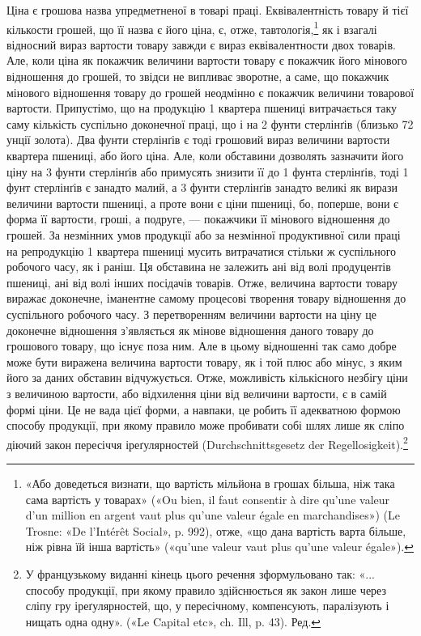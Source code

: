 Ціна є грошова назва упредметненої в товарі праці. Еквівалентність
товару й тієї кількости грошей, що її назва є його ціна, є,
отже, тавтологія,\footnote{
«Або доведеться визнати, що вартість мільйона в грошах більша,
ніж така сама вартість у товарах» («Ou bien, il faut consentir à dire qu’une
valeur d’un million en argent vaut plus qu’une valeur égale en marchandises»)
(Le Trosne: «De l’Intérêt Social», p. 992), отже, «що дана вартість варта
більше, ніж рівна їй інша вартість» («qu’une valeur vaut plus qu’une valeur
égale»).
} як і взагалі відносний вираз вартости товару
завжди є вираз еквівалентности двох товарів. Але, коли ціна
як покажчик величини вартости товару є покажчик його мінового
відношення до грошей, то звідси не випливає зворотне,
а саме, що покажчик мінового відношення товару до грошей
неодмінно є покажчик величини товарової вартости. Припустімо,
що на продукцію 1 квартера пшениці витрачається таку саму
кількість суспільно доконечної праці, що і на 2 фунти стерлінґів
(близько 72 унції золота). Два фунти стерлінґів є тоді грошовий
вираз величини вартости квартера пшениці, або його ціна.
Але, коли обставини дозволять зазначити його ціну на 3 фунти
стерлінґів або примусять знизити її до 1 фунта стерлінґів, тоді
1 фунт стерлінґів є занадто малий, а 3 фунти стерлінґів занадто
великі як вирази величини вартости пшениці, а проте вони є
ціни пшениці, бо, поперше, вони є форма її вартости, гроші, а
подруге, — покажчики її мінового відношення до грошей. За
незмінних умов продукції або за незмінної продуктивної сили
праці на репродукцію 1 квартера пшениці мусить витрачатися
стільки ж суспільного робочого часу, як і раніш. Ця обставина
не залежить ані від волі продуцентів пшениці, ані від волі інших
посідачів товарів. Отже, величина вартости товару виражає доконечне,
іманентне самому процесові творення товару відношення
до суспільного робочого часу. З перетворенням величини вартости
на ціну це доконечне відношення з’являється як мінове
відношення даного товару до грошового товару, що існує поза
ним. Але в цьому відношенні так само добре може бути виражена
величина вартости товару, як і той плюс або мінус, з яким його
за даних обставин відчужується. Отже, можливість кількісного
незбігу ціни з величиною вартости, або відхилення ціни від величини
вартости, є в самій формі ціни. Це не вада цієї форми, а
навпаки, це робить її адекватною формою способу продукції,
при якому правило може пробивати собі шлях лише як сліпо
діючий закон пересіччя іреґулярностей (Durchschnittsgesetz der
Regellosigkeit).\footnote*{
У французькому виданні кінець цього речення зформульовано
так: «... способу продукції, при якому правило здійснюється як закон
лише через сліпу гру іреґулярностей, що, у пересічному, компенсують,
паралізують і нищать одна одну». («Le Capital etc», ch. Ill, p. 43). Ред.
}


